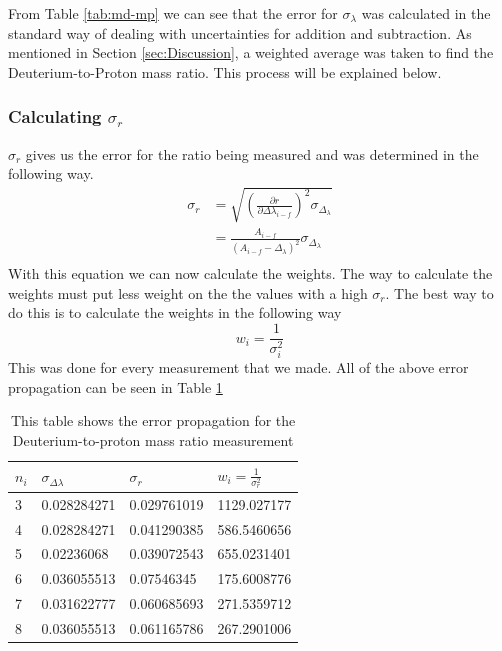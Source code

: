\documentclass[%
 aps,%
 pra,%
 preprint, %
 amsmath, %
 amsfonts, %
 amssymb, %
]{revtex4-2}
\newcommand{\D}{Deuterium}
\begin{document}
From Table \ref{tab:md-mp} we can see that the error for $\sigma_{\lambda}$ was calculated in the standard way of dealing with uncertainties for addition and subtraction\cite{Taylor1997}. As mentioned in Section \ref{sec:Discussion}, a weighted average was taken to find the \D-to-Proton mass ratio. This process will be explained below.

\subsubsection{Calculating $\sigma_r$}
$\sigma_r$ gives us the error for the ratio being measured and was determined in the following way.
\begin{align*}
    \sigma_r&=\sqrt{(\frac{\partial r}{\partial \Delta \lambda_{i-f}})^2 \sigma_{\Delta_{\lambda}}}\\
    &=\frac{A_{i-f}}{(A_{i-f}-\Delta_{\lambda})^2} \sigma_{\Delta_{\lambda}}\\
\end{align*}{}
With this equation we can now calculate the weights. The way to calculate the weights must put less weight on the the values with a high $\sigma_r$. The best way to do this is to calculate the weights in the following way
\begin{equation}
    \label{Eq:weights}
    w_i=\frac{1}{\sigma_i^2}
\end{equation}{}
This was done for every measurement that we made. All of the above error propagation can be seen in Table \ref{tab:md-mp-error}



\begin{table}[]
\begin{tabular}{l|l|l|l}
\hline
\hline
$n_i$ & $\sigma_{\Delta \lambda}$ & $\sigma_{r}$ & $w_i=\frac{1}{\sigma_r^2}$ \\
\hline
3 & 0.028284271 & 0.029761019 & 1129.027177 \\
4 & 0.028284271 & 0.041290385 & 586.5460656 \\
5 & 0.02236068 & 0.039072543 & 655.0231401 \\
6 & 0.036055513 & 0.07546345 & 175.6008776 \\
7 & 0.031622777 & 0.060685693 & 271.5359712 \\
8 & 0.036055513 & 0.061165786 & 267.2901006\\
\hline
\hline
\end{tabular}
\caption{This table shows the error propagation for the \D-to-proton mass ratio measurement}
\label{tab:md-mp-error}
\end{table}
\newpage
\end{document}
